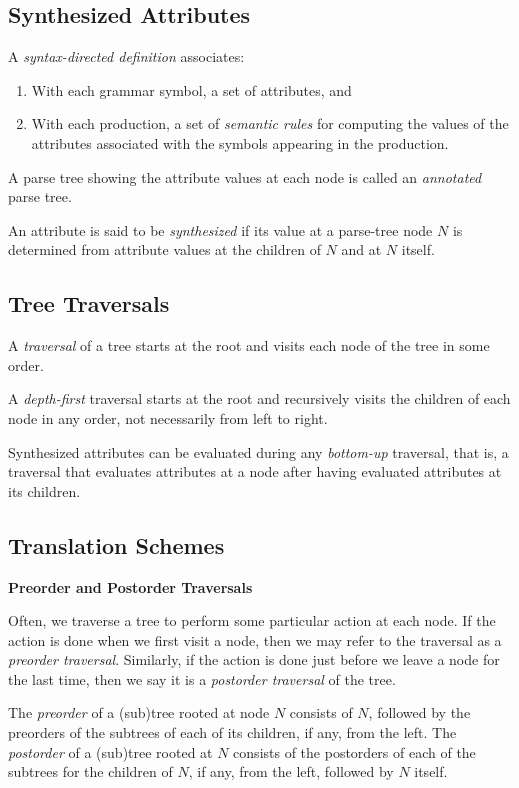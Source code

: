\documentclass[12pt,a4paper,twoside,openany]{book}
\begin{document}
\subsection{Synthesized Attributes}

A \textit{syntax-directed definition} associates:
\begin{enumerate}
    \item With each grammar symbol, a set of attributes, and
    \item With each production, a set of \textit{semantic rules} for computing the values of the attributes associated with the symbols appearing in the production.
\end{enumerate}

A parse tree showing the attribute values at each node is called an \textit{annotated} parse tree.

An attribute is said to be \textit{synthesized} if its value at a parse-tree node $N$ is determined from attribute values at the children of $N$ and at $N$ itself.

\subsection{Tree Traversals}

A \textit{traversal} of a tree starts at the root and visits each node of the tree in some order.

A \textit{depth-first} traversal starts at the root and recursively visits the children of each node in any order, not necessarily from left to right.

Synthesized attributes can be evaluated during any \textit{bottom-up} traversal, that is, a traversal that evaluates attributes at a node after having evaluated attributes at its children.

\subsection{Translation Schemes}

\begin{framed}
    \begin{center}
        \textbf{{\large Preorder and Postorder Traversals}}
    \end{center}

    Often, we traverse a tree to perform some particular action at each node. If the action is done when we first visit a node, then we may refer to the traversal as a \textit{preorder traversal}. Similarly, if the action is done just before we leave a node for the last time, then we say it is a \textit{postorder traversal} of the tree.

    The \textit{preorder} of a (sub)tree rooted at node $N$ consists of $N$, followed by the preorders of the subtrees of each of its children, if any, from the left. The \textit{postorder} of a (sub)tree rooted at $N$ consists of the postorders of each of the subtrees for the children of $N$, if any, from the left, followed by $N$ itself.
\end{framed}
\end{document}
